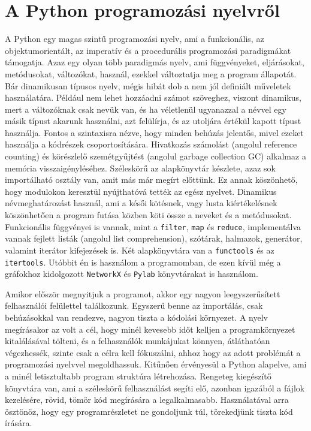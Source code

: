 \documentclass[
]{thesis-ekf}
\theoremstyle{definition}
\theoremstyle{remark}
\begin{document}
	\section{A Python programozási nyelvről}\label{kif-python-programnyelv}
	A Python egy magas szintű programozási nyelv, ami a funkcionális, az objektumorientált, az imperatív és a procedurális programozási paradigmákat támogatja. Azaz egy olyan több paradigmás nyelv, ami függvényeket, eljárásokat, metódusokat, változókat, használ, ezekkel változtatja meg a program állapotát. Bár dinamikusan típusos nyelv, mégis hibát dob a nem jól definiált műveletek használatára. Például nem lehet hozzáadni számot szöveghez, viszont dinamikus, mert a változóknak csak nevük van, és ha véletlenül ugyanazzal a névvel egy másik típust akarunk használni, azt felülírja, és az utoljára értékül kapott típust használja. Fontos a szintaxisra nézve, hogy minden behúzás jelentős, mivel ezeket használja a kódrészek csoportosítására. Hivatkozás számolást (angolul reference counting) és körészlelő szemétgyűjtést (angolul garbage collection GC) alkalmaz a memória visszaigényléséhez. Széleskörű az alapkönyvtár készlete, azaz sok importálható osztály van, amit más már megírt előttünk. Ez annak köszönhető, hogy modulokon keresztül nyújthatóvá tették az egész nyelvet. Dinamikus névmeghatározást használ, ami a késői kötésnek, vagy lusta kiértékelésnek köszönhetően a program futása közben köti össze a neveket és a metódusokat. Funkcionális függvényei is vannak, mint a \texttt{filter}, \texttt{map} és \texttt{reduce}, implementálva vannak fejlett listák (angolul list comprehension), szótárak, halmazok, generátor, valamint iterátor kifejezések is. Két alapkönyvtára van a \texttt{functools} és az \texttt{itertools}. Utóbbit én is használom a programomban, de ezen kívül még a gráfokhoz kidolgozott \texttt{NetworkX} és \texttt{Pylab} könyvtárakat is használom.
	
	Amikor először megnyitjuk a programot, akkor egy nagyon leegyszerűsített felhasználói felülettel találkozunk. Egyszerű benne az importálás, csak behúzásokkal van rendezve, nagyon tiszta a kódolási környezet. A nyelv megírásakor az volt a cél, hogy minél kevesebb időt kelljen a programkörnyezet kitalálásával tölteni, és a felhasználók munkájukat könnyen, átláthatóan végezhessék, szinte csak a célra kell fókuszálni, ahhoz hogy az adott problémát a programozási nyelvvel megoldhassuk. Kitűnően érvényesül a Python alapelve, ami a minél letisztultabb program struktúra létrehozása. Rengeteg kiegészítő könyvtára van, ami a széleskörű felhasználást segíti elő, azonban igazából a fájlok kezelésére, rövid, tömör kód megírására a legalkalmasabb. Használatával arra ösztönöz, hogy egy programrészletet ne gondoljunk túl, törekedjünk tiszta kód írására.
	
\end{document}
